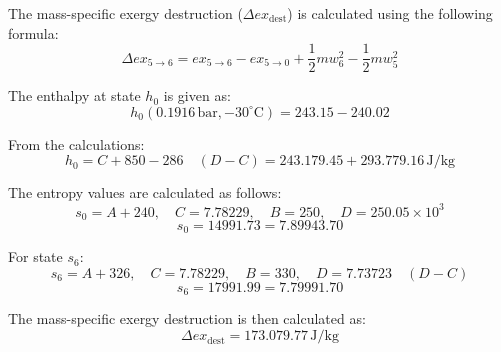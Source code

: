 The mass-specific exergy destruction (\( \Delta ex_{\text{dest}} \)) is calculated using the following formula:  
\[
\Delta ex_{5 \to 6} = ex_{5 \to 6} - ex_{5 \to 0} + \frac{1}{2} m w_6^2 - \frac{1}{2} m w_5^2
\]  

The enthalpy at state \( h_0 \) is given as:  
\[
h_0 (0.1916 \, \text{bar}, -30^\circ\text{C}) = 243.15 - 240.02
\]  

From the calculations:  
\[
h_0 = C + 850 - 286 \quad (D - C) = 243.179.45 + 293.779.16 \, \text{J/kg}
\]  

The entropy values are calculated as follows:  
\[
s_0 = A + 240, \quad C = 7.78229, \quad B = 250, \quad D = 250.05 \times 10^3
\]  
\[
s_0 = 14991.73 = 7.89943.70
\]  

For state \( s_6 \):  
\[
s_6 = A + 326, \quad C = 7.78229, \quad B = 330, \quad D = 7.73723 \quad (D - C)
\]  
\[
s_6 = 17991.99 = 7.79991.70
\]  

The mass-specific exergy destruction is then calculated as:  
\[
\Delta ex_{\text{dest}} = 173.079.77 \, \text{J/kg}
\]